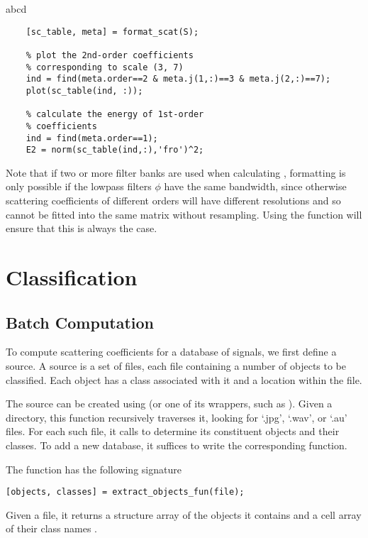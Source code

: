 \documentclass[twocolumn]{article}
\begin{document}
abcd
\begin{lstlisting}
	[sc_table, meta] = format_scat(S);
	
	% plot the 2nd-order coefficients
	% corresponding to scale (3, 7)
	ind = find(meta.order==2 & meta.j(1,:)==3 & meta.j(2,:)==7);
	plot(sc_table(ind, :));
	
	% calculate the energy of 1st-order
	% coefficients
	ind = find(meta.order==1);
	E2 = norm(sc_table(ind,:),'fro')^2;
\end{lstlisting}

Note that if two or more filter banks are used when calculating , formatting is only possible if the lowpass filters $\phi$ have the same bandwidth, since otherwise scattering coefficients of different orders will have different resolutions and so cannot be fitted into the same matrix without resampling. Using the  function will ensure that this is always the case.

\section{Classification}

\subsection{Batch Computation}

To compute scattering coefficients for a database of signals, we first define a source. A source is a set of files, each file containing a number of objects to be classified. Each object has a class associated with it and a location within the file.

The source can be created using  (or one of its wrappers, such as ). Given a directory, this function recursively traverses it, looking for `.jpg', `.wav', or `.au' files. For each such file, it calls  to determine its constituent objects and their classes. To add a new database, it suffices to write the corresponding  function.

The  function has the following signature
\begin{lstlisting}
[objects, classes] = extract_objects_fun(file);
\end{lstlisting}
Given a file, it returns a structure array  of the objects it contains and a cell array of their class names . 
\end{document}
